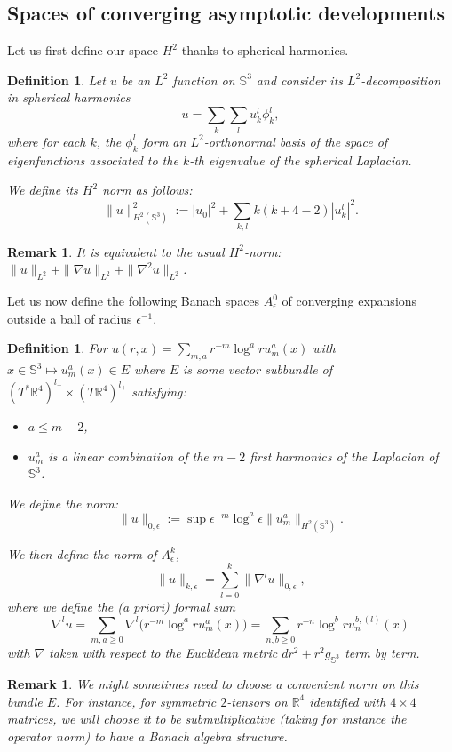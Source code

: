 \documentclass[12pt]{article}
\newtheorem{defn}[thm]{Definition}
\newtheorem{rem}[thm]{Remark}
\begin{document}
    \subsection{Spaces of converging asymptotic developments}
   Let us first define our space $H^2$ thanks to spherical harmonics.
    
    \begin{defn}
        Let $ u $ be an $L^2$ function on $\mathbb{S}^3$ and consider its $L^2$-decomposition in spherical harmonics
        $$ u = \sum_k \sum_lu_k^l\phi_k^l , $$
        where for each $k$, the $\phi_k^l$ form an $L^2$-orthonormal basis of the space of eigenfunctions associated to the $k$-th eigenvalue of the spherical Laplacian.
        
        We define its $H^2$ norm as follows:
        $$\|u\|^2_{H^2(\mathbb{S}^3)} := |u_0|^2 + \sum_{k,l} k(k+4-2) |u_k^l|^2.$$
    \end{defn}
    \begin{rem}
        It is equivalent to the usual $H^2$-norm: $\|u\|_{L^2} + \|\nabla u\|_{L^2} +\|\nabla^2 u\|_{L^2}$.
    \end{rem}
     Let us now define the following Banach spaces $A^0_\epsilon$ of converging expansions outside a ball of radius $\epsilon^{-1}$. 
    \begin{defn}
        For $u(r,x) = \sum_{m,a}r^{-m}\log^ar u_m^a(x)$ with $x\in \mathbb{S}^3 \mapsto u_m^a(x) \in E$ where $E$ is some vector subbundle of $(T^*\mathbb{R}^4)^{l_-}\times (T\mathbb{R}^4)^{l_+}$ satisfying:
        \begin{itemize}
            \item $a\leqslant m-2$,
            \item $u_m^a$ is a linear combination of the $m-2$ first harmonics of the Laplacian of $\mathbb{S}^3$.
        \end{itemize}
        We define the norm:
    $$\|u\|_{0,\epsilon}:= \sup \epsilon^{-m}\log^a\epsilon \|u_m^a\|_{H^2(\mathbb{S}^3)}. $$
        
    We then define the norm of $A^k_\epsilon$, $$\|u\|_{k,\epsilon} = \sum_{l=0}^k \|\nabla^lu\|_{0,\epsilon},$$
    where we define the (a priori) formal sum $$ \nabla^l u  = \sum_{m,a\geqslant 0}\nabla^l \Big(r^{-m}\log^ar u_m^a(x)\Big) = \sum_{n,b\geqslant 0} r^{-n}\log^bru_n^{b,(l)}(x)$$
    with $\nabla$ taken with respect to the Euclidean metric $dr^2 + r^2g_{\mathbb{S}^3}$ term by term. 
    \end{defn}
    \begin{rem}
        We might sometimes need to choose a convenient norm on this bundle $E$. For instance, for symmetric $2$-tensors on $\mathbb{R}^4$ identified with $4\times 4$ matrices, we will choose it to be submultiplicative (taking for instance the operator norm) to have a Banach algebra structure.
    \end{rem}
\end{document}
